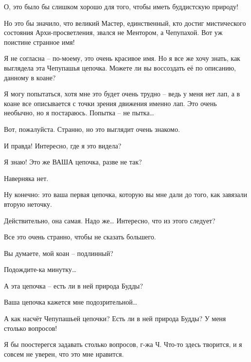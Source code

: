 \documentclass[../main.tex]{subfiles}
\begin{document}
\begin{dialogue}
 О, это было бы слишком хорошо для того, чтобы иметь буддистскую природу!

 Но это бы значило, что великий Мастер, единственный, кто достиг мистического состояния Архи-просветления, звался не Ментором, а Чепупахой. Вот уж поистине странное имя!

 Я не согласна \--- по-моему, это очень красивое имя. Но я все же хочу знать, как выглядела эта Чепупашья цепочка. Можете ли вы воссоздать её по описанию, данному в коане?

 Я могу попытаться, хотя мне это будет очень трудно \--- ведь у меня нет лап, а в коане все описывается с точки зрения движения именно лап. Это очень необычно, но я постараюсь. Попытка \--- не пытка\ldots{}


Вот, пожалуйста. Странно, но это выглядит очень знакомо.

 И правда! Интересно, где я это видела?

 Я знаю! Это же ВАША цепочка, разве не так?

 Наверняка нет.

 Ну конечно: это ваша первая цепочка, которую вы мне дали до того, как завязали вторую неточку.

 Действительно, она самая. Надо же\ldots{} Интересно, что из этого следует?

 Все это очень странно, чтобы не сказать большего.

 Вы думаете, мой коан \--- подлинный?

 Подождите-ка минутку\ldots{}

 А эта цепочка \--- есть ли в ней природа Будды?

 Ваша цепочка кажется мне подозрительной\ldots{}

 А как насчёт Чепупашьей цепочки? Есть ли в ней природа Будды? У меня столько вопросов!

 Я бы поостерегся задавать столько вопросов, г-жа Ч\@. Что-то здесь творится, и я совсем не уверен, что это мне нравится.


\end{dialogue}
\end{document}
